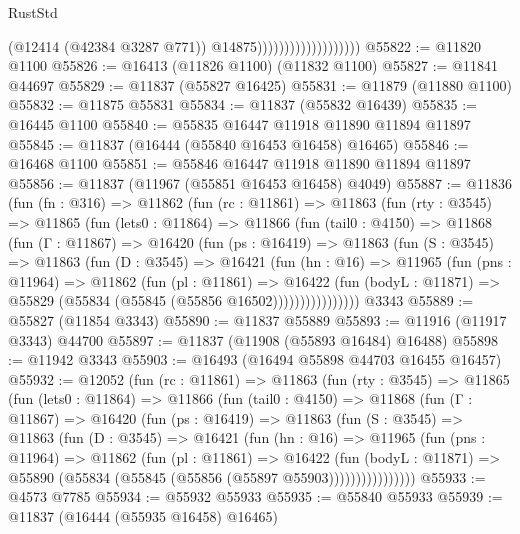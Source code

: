 \begin{lexlean}{RustStd}
\begin{coremodule}
                                          (@12414 (@42384 @3287 @771))
                                          @14875)))))))))))))))))))
@55822 := @11820 @1100
@55826 := @16413 (@11826 @1100) (@11832 @1100)
@55827 := @11841 @44697
@55829 := @11837 (@55827 @16425)
@55831 := @11879 (@11880 @1100)
@55832 := @11875 @55831
@55834 := @11837 (@55832 @16439)
@55835 := @16445 @1100
@55840 := @55835 @16447 @11918 @11890 @11894 @11897
@55845 := @11837 (@16444 (@55840 @16453 @16458) @16465)
@55846 := @16468 @1100
@55851 := @55846 @16447 @11918 @11890 @11894 @11897
@55856 := @11837 (@11967 (@55851 @16453 @16458) @4049)
@55887 := @11836
    (fun (fn : @316) =>
    @11862
      (fun (rc : @11861) =>
      @11863
        (fun (rty : @3545) =>
        @11865
          (fun (lets0 : @11864) =>
          @11866
            (fun (tail0 : @4150) =>
            @11868
              (fun (Γ : @11867) =>
              @16420
                (fun (ps : @16419) =>
                @11863
                  (fun (S : @3545) =>
                  @11863
                    (fun (D : @3545) =>
                    @16421
                      (fun (hn : @16) =>
                      @11965
                        (fun (pns : @11964) =>
                        @11862
                          (fun (pl : @11861) =>
                          @16422
                            (fun (bodyL : @11871) =>
                            @55829 (@55834 (@55845 (@55856 @16502))))))))))))))))
    @3343
@55889 := @55827 (@11854 @3343)
@55890 := @11837 @55889
@55893 := @11916 (@11917 @3343) @44700
@55897 := @11837 (@11908 (@55893 @16484) @16488)
@55898 := @11942 @3343
@55903 := @16493 (@16494 @55898 @44703 @16455 @16457)
@55932 := @12052
    (fun (rc : @11861) =>
    @11863
      (fun (rty : @3545) =>
      @11865
        (fun (lets0 : @11864) =>
        @11866
          (fun (tail0 : @4150) =>
          @11868
            (fun (Γ : @11867) =>
            @16420
              (fun (ps : @16419) =>
              @11863
                (fun (S : @3545) =>
                @11863
                  (fun (D : @3545) =>
                  @16421
                    (fun (hn : @16) =>
                    @11965
                      (fun (pns : @11964) =>
                      @11862
                        (fun (pl : @11861) =>
                        @16422
                          (fun (bodyL : @11871) =>
                          @55890 (@55834 (@55845 (@55856 (@55897 @55903))))))))))))))))
@55933 := @4573 @7785
@55934 := @55932 @55933
@55935 := @55840 @55933
@55939 := @11837 (@16444 (@55935 @16458) @16465)

\end{coremodule}
\end{lexlean}
